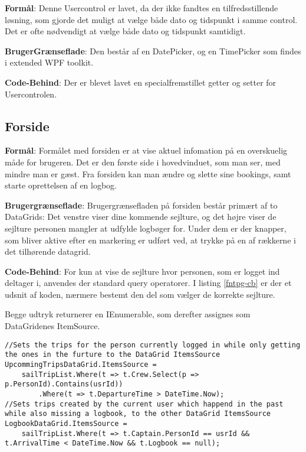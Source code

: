 \textbf{Formål}: 
Denne Usercontrol er lavet, da der ikke fandtes en tilfredsstillende løsning, som gjorde det muligt at vælge både dato og tidspunkt i samme control. 
Det er ofte nødvendigt at vælge både dato og tidspunkt samtidigt. 

\textbf{BrugerGrænseflade}: 
Den består af en DatePicker, og en TimePicker som findes i extended WPF toolkit.

\textbf{Code-Behind}: 
Der er blevet lavet en specialfremstillet getter og setter for Usercontrolen. 


\subsection{Forside}

\textbf{Formål}: 
Formålet med forsiden er at vise aktuel infomation på en overskuelig måde for brugeren.
Det er den første side i hovedvinduet, som man ser, med mindre man er gæst.
Fra forsiden kan man ændre og slette sine bookings, samt starte oprettelsen af en logbog.

\textbf{Brugergrænseflade}: 
Brugergrænsefladen på forsiden består primært af to DataGrids: Det venstre viser dine kommende sejlture, og det højre viser de sejlture personen mangler at udfylde logbøger for. 
Under dem er der knapper, som bliver aktive efter en markering er udført ved, at trykke på en af rækkerne i det tilhørende datagrid.

\textbf{Code-Behind}: 
For kun at vise de sejlture hvor personen, som er logget ind deltager i, anvendes der standard query operatorer. 
I listing \ref{fntpg-cb} er der et udsnit af koden, nærmere bestemt den del som vælger de korrekte sejlture.

Begge udtryk returnerer en IEnumerable, som derefter assignes som DataGridenes ItemSource.

\begin{lstlisting}[frame=single, caption=Forsidens Code-Behind, label=fntpg-cb]
//Sets the trips for the person currently logged in while only getting the ones in the furture to the DataGrid ItemsSource
UpcommingTripsDataGrid.ItemsSource =
    sailTripList.Where(t => t.Crew.Select(p => p.PersonId).Contains(usrId))
        .Where(t => t.DepartureTime > DateTime.Now);
//Sets trips created by the current user which happend in the past while also missing a logbook, to the other DataGrid ItemsSource 
LogbookDataGrid.ItemsSource =
    sailTripList.Where(t => t.Captain.PersonId == usrId && t.ArrivalTime < DateTime.Now && t.Logbook == null);
\end{lstlisting}

